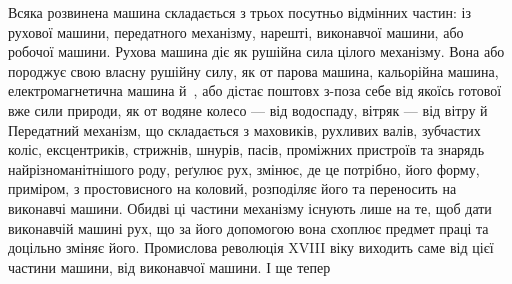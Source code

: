 Всяка розвинена машина складається з трьох посутньо відмінних
частин: із рухової машини, передатного механізму, нарешті,
виконавчої машини, або робочої машини. Рухова машина
діє як рушійна сила цілого механізму. Вона або породжує свою
власну рушійну силу, як от парова машина, кальорійна машина,
електромагнетична машина й~, або дістає поштовх з-поза
себе від якоїсь готової вже сили природи, як от водяне колесо — від
водоспаду, вітряк — від вітру й~ Передатний механізм,
що складається з маховиків, рухливих валів, зубчастих коліс,
ексцентриків, стрижнів, шнурів, пасів, проміжних пристроїв
та знарядь найрізноманітнішого роду, реґулює рух, змінює, де
це потрібно, його форму, приміром, з простовисного на коловий,
розподіляє його та переносить на виконавчі машини. Обидві ці
частини механізму існують лише на те, щоб дати виконавчій машині
рух, що за його допомогою вона схоплює предмет праці та
доцільно зміняє його. Промислова революція XVIII віку виходить
саме від цієї частини машини, від виконавчої машини. І ще тепер
\parbreak{}  %
